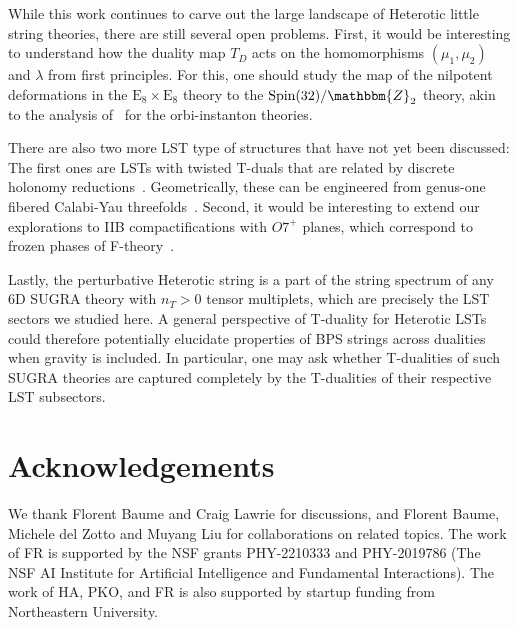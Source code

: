 \documentclass[11pt]{article}
\numberwithin{equation}{section}
\begin{document}
While this work continues to carve out the large landscape of Heterotic little string theories, there are still several open problems. First, it would be interesting to understand how the duality map $T_D$ acts on the homomorphisms $(\mu_1,\mu_2)$ and $\lambda$ from first principles. For this, one should study the map of the nilpotent deformations in the $\text{E}_8\times\text{E}_8$ theory to the $\text{Spin}(32)/\mathbbm{Z}_2$ theory, akin to the analysis of~\cite{Frey:2018vpw} for the orbi-instanton theories.

There are also two more LST type of structures that have not yet been discussed: The first ones are LSTs with twisted T-duals that are related by discrete holonomy reductions~\cite{Bhardwaj:2019fzv,DelZotto:2020sop,Bhardwaj:2022ekc}. Geometrically, these can be engineered from genus-one fibered Calabi-Yau threefolds~\cite{Oehlmann:2019ohh,Anderson:2023wkr,Anderson:2023tfy}. Second, it would be interesting to extend our explorations to IIB compactifications with $O7^+$ planes, which correspond to frozen phases of F-theory~\cite{deBoer:2001wca,Tachikawa:2015wka,Bhardwaj:2018jgp, Morrison:2023hqx}. 

Lastly, the perturbative Heterotic string is a part of the string spectrum of any 6D SUGRA theory with $n_T>0$ tensor multiplets, which are precisely the LST sectors we studied here. A general perspective of T-duality for Heterotic LSTs could therefore potentially elucidate properties of BPS strings across dualities when gravity is included. In particular, one may ask whether T-dualities of such SUGRA theories are captured completely by the T-dualities of their respective LST subsectors.


\section*{Acknowledgements}
We thank Florent Baume and Craig Lawrie for discussions, and Florent Baume, Michele del Zotto and Muyang Liu for collaborations on related topics. The work of FR is supported by the NSF grants PHY-2210333 and PHY-2019786 (The NSF AI Institute for Artificial Intelligence and Fundamental Interactions). The work of HA, PKO, and FR is also supported by startup funding from Northeastern University.%
 
\appendix
\clearpage
\end{document}
